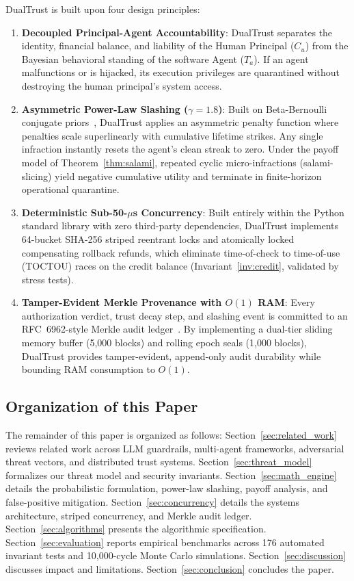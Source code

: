 \documentclass[manuscript, screen, review]{jair}
\begin{document}
DualTrust is built upon four design principles:
\begin{enumerate}[leftmargin=12pt, topsep=2pt, itemsep=1pt]
\item \textbf{Decoupled Principal-Agent Accountability}: DualTrust separates the identity, financial balance, and liability of the Human Principal ($C_u$) from the Bayesian behavioral standing of the software Agent ($T_a$). If an agent malfunctions or is hijacked, its execution privileges are quarantined without destroying the human principal's system access.
\item \textbf{Asymmetric Power-Law Slashing ($\gamma = 1.8$)}: Built on Beta-Bernoulli conjugate priors~\cite{josang2002beta}, DualTrust applies an asymmetric penalty function where penalties scale superlinearly with cumulative lifetime strikes. Any single infraction instantly resets the agent's clean streak to zero. Under the payoff model of Theorem~\ref{thm:salami}, repeated cyclic micro-infractions (salami-slicing) yield negative cumulative utility and terminate in finite-horizon operational quarantine.
\item \textbf{Deterministic Sub-50-$\mu$s Concurrency}: Built entirely within the Python standard library with zero third-party dependencies, DualTrust implements 64-bucket SHA-256 striped reentrant locks and atomically locked compensating rollback refunds, which eliminate time-of-check to time-of-use (TOCTOU) races on the credit balance (Invariant~\ref{inv:credit}, validated by stress tests).
\item \textbf{Tamper-Evident Merkle Provenance with $O(1)$ RAM}: Every authorization verdict, trust decay step, and slashing event is committed to an RFC~6962-style Merkle audit ledger~\cite{laurie2013certificate}. By implementing a dual-tier sliding memory buffer (5,000 blocks) and rolling epoch seals (1,000 blocks), DualTrust provides tamper-evident, append-only audit durability while bounding RAM consumption to $O(1)$.
\end{enumerate}

\subsection{Organization of this Paper}
The remainder of this paper is organized as follows: Section~\ref{sec:related_work} reviews related work across LLM guardrails, multi-agent frameworks, adversarial threat vectors, and distributed trust systems. Section~\ref{sec:threat_model} formalizes our threat model and security invariants. Section~\ref{sec:math_engine} details the probabilistic formulation, power-law slashing, payoff analysis, and false-positive mitigation. Section~\ref{sec:concurrency} details the systems architecture, striped concurrency, and Merkle audit ledger. Section~\ref{sec:algorithms} presents the algorithmic specification. Section~\ref{sec:evaluation} reports empirical benchmarks across 176 automated invariant tests and 10,000-cycle Monte Carlo simulations. Section~\ref{sec:discussion} discusses impact and limitations. Section~\ref{sec:conclusion} concludes the paper.
\end{document}
